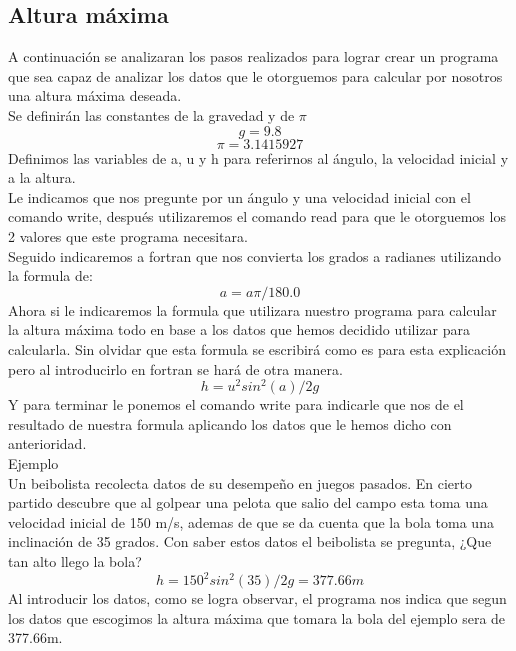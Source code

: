 \documentclass{article}
\begin{document}
\subsection{Altura máxima}
A continuación se analizaran los pasos realizados para lograr crear un programa que sea capaz de analizar los datos que le otorguemos para calcular por nosotros una altura máxima deseada.\\
Se definirán las constantes de la gravedad y de \(\pi\)\\
\[g=9.8\]
\[\pi=3.1415927\]
Definimos las variables de a, u y h para referirnos al ángulo, la velocidad inicial y a la altura.\\
Le indicamos que nos pregunte por un ángulo y una velocidad inicial con el comando write, después utilizaremos el comando read para que le otorguemos los 2 valores que este programa necesitara.\\
Seguido indicaremos a fortran que nos convierta los grados a radianes utilizando la formula de:
\[a=a\pi/180.0\]
Ahora si le indicaremos la formula que utilizara nuestro programa para calcular la altura máxima todo en base a los datos que hemos decidido utilizar para calcularla. Sin olvidar que esta formula se escribirá como es para esta explicación pero al introducirlo en fortran se hará de otra manera.
\[h=u^{2}sin^{2}(a)/2g\]
Y para terminar le ponemos el comando write para indicarle que nos de el resultado de nuestra formula aplicando los datos que le hemos dicho con anterioridad.\\
Ejemplo\\
Un beibolista recolecta datos de su desempeño en juegos pasados. En cierto partido descubre que al golpear una pelota que salio del campo esta toma una velocidad inicial de 150 m/s, ademas de que se da cuenta que la bola toma una inclinación de 35 grados. Con saber estos datos el beibolista se pregunta, ¿Que tan alto llego la bola?
\[h=150^{2}sin^{2}(35)/2g=377.66m\]
Al introducir los datos, como se logra observar, el programa nos indica que segun los datos que escogimos la altura máxima que tomara la bola del ejemplo sera de 377.66m.
\end{document}
